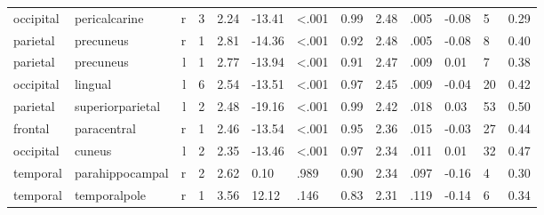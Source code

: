 \documentclass{article}
\begin{document}
\begin{longtable}{llrR{1.3cm}R{1cm}R{1.3cm}R{1cm}R{1cm}R{1.3cm}R{1cm}R{1.8cm}R{1.3cm}R{1.8cm}}
 occipital &             pericalcarine &    r &         3 &                  2.24 &           -13.41 &      \textless.001 &                               0.99 &                          2.48 &                            .005 &  -0.08 &      5 &      0.29 \\
  parietal &                 precuneus &    r &         1 &                  2.81 &           -14.36 &      \textless.001 &                               0.92 &                          2.48 &                            .005 &  -0.08 &      8 &      0.40 \\
  parietal &                 precuneus &    l &         1 &                  2.77 &           -13.94 &      \textless.001 &                               0.91 &                          2.47 &                            .009 &   0.01 &      7 &      0.38 \\
 occipital &                   lingual &    l &         6 &                  2.54 &           -13.51 &      \textless.001 &                               0.97 &                          2.45 &                            .009 &  -0.04 &     20 &      0.42 \\
  parietal &          superiorparietal &    l &         2 &                  2.48 &           -19.16 &      \textless.001 &                               0.99 &                          2.42 &                            .018 &   0.03 &     53 &      0.50 \\
   frontal &               paracentral &    r &         1 &                  2.46 &           -13.54 &      \textless.001 &                               0.95 &                          2.36 &                            .015 &  -0.03 &     27 &      0.44 \\
 occipital &                    cuneus &    l &         2 &                  2.35 &           -13.46 &      \textless.001 &                               0.97 &                          2.34 &                            .011 &   0.01 &     32 &      0.47 \\
  temporal &           parahippocampal &    r &         2 &                  2.62 &             0.10 &               .989 &                               0.90 &                          2.34 &                            .097 &  -0.16 &      4 &      0.30 \\
  temporal &              temporalpole &    r &         1 &                  3.56 &            12.12 &               .146 &                               0.83 &                          2.31 &                            .119 &  -0.14 &      6 &      0.34 \\

\end{longtable}
\end{document}
